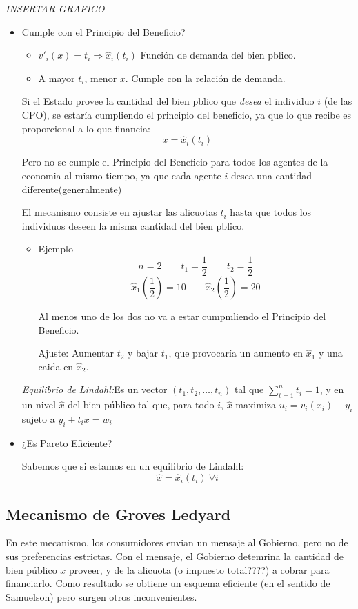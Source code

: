 \emph{INSERTAR GRAFICO}
\begin{itemize}
	\item Cumple con el Principio del Beneficio?

\begin{itemize}
	\item $v'_i(x)=t_i \Rightarrow \hat{x}_i (t_i)$  Función de demanda del bien pblico.
	\item A mayor $t_i$, menor $x$. Cumple con la relación de demanda.
\end{itemize}

Si el Estado provee la cantidad del bien pblico que \textit{desea} el individuo $i$ (de las CPO), se estaría cumpliendo el principio del beneficio, ya que lo que recibe es proporcional a lo que financia:
$$x=\hat{x}_i(t_i)$$

Pero no se cumple el Principio del Beneficio para todos los agentes de la economia al mismo tiempo, ya que cada agente $i$ desea una cantidad diferente(generalmente)

El mecanismo consiste en ajustar las alicuotas $t_i$ hasta que todos los individuos deseen la misma cantidad del bien pblico.

\begin{itemize}
	\item Ejemplo
	$$n=2 \qquad t_1=\frac{1}{2} \qquad t_2=\frac{1}{2}$$
	$$\hat{x}_1(\frac{1}{2})=10 \qquad \hat{x}_2 (\frac{1}{2})=20$$
	
	Al menos uno de los dos no va a estar cumpmliendo el Principio del Beneficio.
	
	Ajuste: Aumentar $t_2$ y bajar $t_1$, que provocaría un aumento en $\hat{x}_1$ y una caida en $\hat{x}_2$.
\end{itemize}

\emph{Equilibrio de Lindahl:}Es un vector $(t_1, t_2, \ldots, t_n)$ tal que $\sum_{t=1}^{n}t_i=1$, y en un nivel $\hat{x}$ del bien público tal que, para todo $i$, $\hat{x}$ maximiza $u_i=v_i(x_i)+y_i$ sujeto a $y_i+t_i x=w_i$

\item ¿Es Pareto Eficiente?

Sabemos que si estamos en un equilibrio de Lindahl: 
$$\hat{x}=\hat{x}_i (t_i) \:\forall i$$
\end{itemize}

\subsection{Mecanismo de Groves Ledyard}
En este mecanismo, los consumidores envian un mensaje al Gobierno, pero no de sus preferencias estrictas.
Con el mensaje, el Gobierno detemrina la cantidad de bien público $x$ proveer, y de la alicuota (o impuesto total????) a cobrar para financiarlo. Como resultado se obtiene un esquema eficiente (en el sentido de Samuelson) pero surgen otros inconvenientes.

